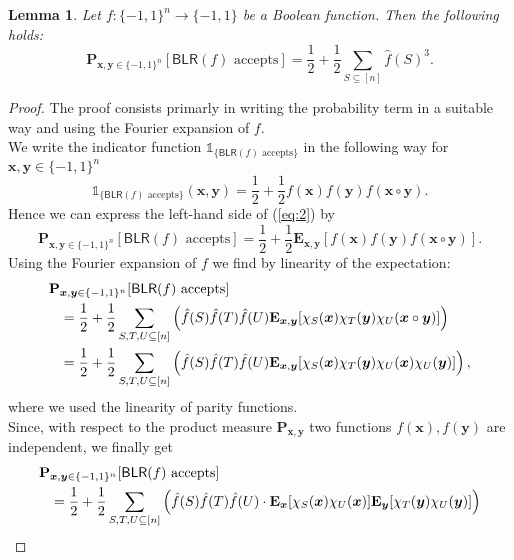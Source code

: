\documentclass[a4paper]{article}
\newcommand{\prob}{\mathbf{P}}
\newcommand{\expe}{\mathbf{E}}
\newcommand{\nset}{[n]}
\newcommand{\boldx}{\boldsymbol{x}}
\newcommand{\boldy}{\boldsymbol{y}}
\theoremstyle{plain}
\newtheorem{lemma}{Lemma}
\theoremstyle{definition}
\theoremstyle{remark}
\begin{document}
\begin{lemma} \label{lem:1}
  Let \(f: \{-1,1\}^n \rightarrow \{-1,1\}\) be a Boolean function. Then
  the following holds: 
  \begin{equation}
    \label{eq:2}
    \prob_{\boldx,\boldy \in \{-1,1\}^n}[\textsf{BLR}(f) \text{ accepts}] = \frac{1}{2} + \frac{1}{2}\sum_{S\subseteq \nset}\hat{f}(S)^3.
  \end{equation}
\end{lemma}

\begin{proof}
  The proof consists primarly in writing the probability term in a
  suitable way and using the Fourier expansion of \(f\). \\
  We write the indicator function \(\mathbb{1}_{\{\textsf{BLR}(f) \text{ accepts}\}}\) in the
  following way for \(\boldx,\boldy \in \{-1,1\}^n\)
  \[\mathbb{1}_{\{\textsf{BLR}(f) \text{ accepts}\}}(\boldx,\boldy) =
  \frac{1}{2} + \frac{1}{2}f(\boldx)f(\boldy)f(\boldx\circ \boldy).\]
  Hence we can express the left-hand side of (\ref{eq:2}) by
  \[\prob_{\boldx,\boldy \in \{-1,1\}^n}[\textsf{BLR}(f) \text{ accepts}] =
  \frac{1}{2} + \frac{1}{2} \expe_{\boldx,\boldy}[f(\boldx) f(\boldy)
  f(\boldx\circ\boldy)].\] 
  Using the Fourier expansion of \(f\) we find by linearity of the expectation: 
  \begin{align}
    \label{eq:3}
    \prob&_{\boldx,\boldy \in \{-1,1\}^n}[\textsf{BLR}(f) \text{ accepts}] \notag \\  
    &=  \frac{1}{2} + \frac{1}{2} \sum_{S,T,U \subseteq \nset}\left(\hat{f}(S) \hat{f}(T) \hat{f}(U) \expe_{\boldx,\boldy}[\chi_S(\boldx) \chi_T(\boldy) \chi_U(\boldx\circ \boldy)]\right) \\
    &= \frac{1}{2} + \frac{1}{2} \sum_{S,T,U \subseteq \nset}\left(\hat{f}(S) \hat{f}(T) \hat{f}(U) \expe_{\boldx,\boldy}[\chi_S(\boldx) \chi_T(\boldy) \chi_U(\boldx) \chi_U(\boldy)]\right),  
  \end{align}
  where we used the linearity of parity functions. \\
  Since, with respect to the product measure \(\prob_{\boldx,\boldy}\) two functions
  \(f(\boldx),f(\boldy)\) are independent, we finally get 
  \begin{align}
    \label{eq:4}
    \prob&_{\boldx,\boldy \in \{-1,1\}^n}[\textsf{BLR}(f) \text{ accepts}] \notag \\ 
    &= \frac{1}{2} + \frac{1}{2} \sum_{S,T,U \subseteq \nset}\left(\hat{f}(S) \hat{f}(T) \hat{f}(U) \cdot \expe_{\boldx}[\chi_S(\boldx)\chi_U(\boldx)] \expe_{\boldy}[\chi_T(\boldy)\chi_U(\boldy)]\right) \\

\end{align}
\end{proof}
\end{document}
